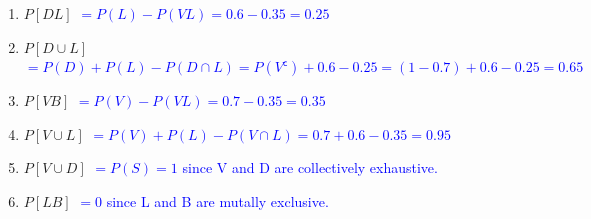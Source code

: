 \documentclass[12pt]{article}
\begin{document}
\begin{enumerate}
    \item[a] \(P[DL]\) \textcolor{blue}{$ = P(L) -P(VL) = 0.6 -0.35 = 0.25$}
    \item[b] \(P[D \cup L]\) \textcolor{blue}{$ = P(D) + P(L) - P(D \cap L) = P(V^\mathsf{c})+ 0.6 - 0.25 = (1 - 0.7) + 0.6 - 0.25 = 0.65$}  
    \item[c] \(P[VB]\) \textcolor{blue}{$ = P(V)-P(VL) = 0.7 - 0.35 = 0.35$} 
    \item[d] \(P[V \cup L]\) \textcolor{blue}{$ = P(V) + P(L) - P(V \cap L) = 0.7 + 0.6 - 0.35 = 0.95$}
    \item[e] \(P[V \cup D]\) \textcolor{blue}{$ = P(S) = 1$ since V and D are collectively exhaustive.}
    \item[f] \(P[LB]\) \textcolor{blue}{$ = 0$ since L and B are mutally exclusive.}
\end{enumerate}
\end{document}
